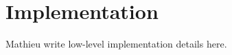\documentclass[review,journal]{vgtc}         %
\begin{document}
\section{Implementation}

Mathieu write low-level implementation details here.

%
%
%
%
%
%
\end{document}
